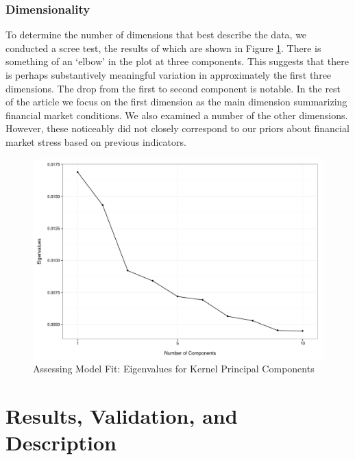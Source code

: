 \documentclass[]{article}
\begin{document}
\subsubsection{Dimensionality}\label{dimensionality}

To determine the number of dimensions that best describe the data, we
conducted a scree test, the results of which are shown in Figure
\ref{scree_plot}. There is something of an `elbow' in the plot at three components.
This suggests that there is perhaps substantively meaningful variation in
approximately the first three dimensions. The drop from the first to
second component is notable. In the rest of the article we focus on the first dimension as the main dimension summarizing financial market conditions. We also examined a number of the other dimensions. However, these noticeably did not closely correspond to our priors about financial market stress based on previous indicators.

\begin{figure}
    \caption{Assessing Model Fit: Eigenvalues for Kernel Principal Components}
    \label{scree_plot}
    \begin{center}
        \includegraphics[scale=0.5]{analysis/figures/scree_plot.pdf}
    \end{center}
\end{figure}

\section{Results, Validation, and Description}\label{results}
\end{document}
